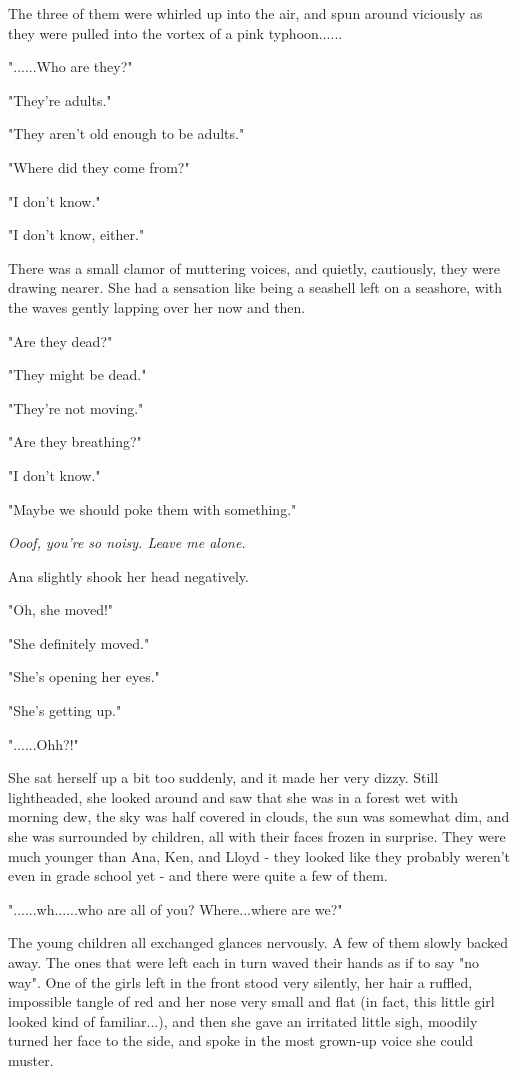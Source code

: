 \documentclass[
]{article}
\begin{document}
The three of them were whirled up into the air, and spun around
viciously as they were pulled into the vortex of a pink typhoon......

"......Who are they?"

"They're adults."

"They aren't old enough to be adults."

"Where did they come from?"

"I don't know."

"I don't know, either."

There was a small clamor of muttering voices, and quietly, cautiously,
they were drawing nearer. She had a sensation like being a seashell left
on a seashore, with the waves gently lapping over her now and then.

"Are they dead?"

"They might be dead."

"They're not moving."

"Are they breathing?"

"I don't know."

"Maybe we should poke them with something."

\emph{Ooof, you're so noisy. Leave me alone.}

Ana slightly shook her head negatively.

"Oh, she moved!"

"She definitely moved."

"She's opening her eyes."

"She's getting up."

"......Ohh?!"

She sat herself up a bit too suddenly, and it made her very dizzy. Still
lightheaded, she looked around and saw that she was in a forest wet with
morning dew, the sky was half covered in clouds, the sun was somewhat
dim, and she was surrounded by children, all with their faces frozen in
surprise. They were much younger than Ana, Ken, and Lloyd - they looked
like they probably weren't even in grade school yet - and there were
quite a few of them.

"......wh......who are all of you? Where...where are we?"

The young children all exchanged glances nervously. A few of them slowly
backed away. The ones that were left each in turn waved their hands as
if to say "no way". One of the girls left in the front stood very
silently, her hair a ruffled, impossible tangle of red and her nose very
small and flat (in fact, this little girl looked kind of familiar...),
and then she gave an irritated little sigh, moodily turned her face to
the side, and spoke in the most grown-up voice she could muster.
\end{document}
